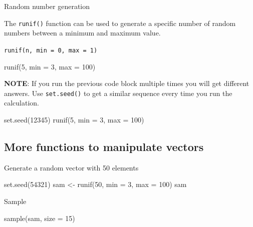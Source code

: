 \documentclass[
  letterpaper,
  DIV=11,
  numbers=noendperiod]{scrreprt}
\newenvironment{Shaded}{}{}
\newcommand{\AttributeTok}[1]{\textcolor[rgb]{0.84,0.23,0.29}{#1}}
\newcommand{\DecValTok}[1]{\textcolor[rgb]{0.00,0.36,0.77}{#1}}
\newcommand{\FunctionTok}[1]{\textcolor[rgb]{0.44,0.26,0.76}{#1}}
\newcommand{\NormalTok}[1]{\textcolor[rgb]{0.14,0.16,0.18}{#1}}
\newcommand{\OtherTok}[1]{\textcolor[rgb]{0.44,0.26,0.76}{#1}}
\begin{document}
Random number generation

The \texttt{runif()} function can be used to generate a specific number
of random numbers between a minimum and maximum value.

\texttt{runif(n,\ min\ =\ 0,\ max\ =\ 1)}

\begin{Shaded}
\begin{Highlighting}[]
\FunctionTok{runif}\NormalTok{(}\DecValTok{5}\NormalTok{, }\AttributeTok{min =} \DecValTok{3}\NormalTok{, }\AttributeTok{max =} \DecValTok{100}\NormalTok{)}
\end{Highlighting}
\end{Shaded}

\textbf{NOTE}: If you run the previous code block multiple times you
will get different answers. Use \texttt{set.seed()} to get a similar
sequence every time you run the calculation.

\begin{Shaded}
\begin{Highlighting}[]
\FunctionTok{set.seed}\NormalTok{(}\DecValTok{12345}\NormalTok{)}
\FunctionTok{runif}\NormalTok{(}\DecValTok{5}\NormalTok{, }\AttributeTok{min =} \DecValTok{3}\NormalTok{, }\AttributeTok{max =} \DecValTok{100}\NormalTok{)}
\end{Highlighting}
\end{Shaded}

\subsection{More functions to manipulate
vectors}\label{more-functions-to-manipulate-vectors}

Generate a random vector with 50 elements

\begin{Shaded}
\begin{Highlighting}[]
\FunctionTok{set.seed}\NormalTok{(}\DecValTok{54321}\NormalTok{)}
\NormalTok{sam }\OtherTok{\textless{}{-}} \FunctionTok{runif}\NormalTok{(}\DecValTok{50}\NormalTok{, }\AttributeTok{min =} \DecValTok{3}\NormalTok{, }\AttributeTok{max =} \DecValTok{100}\NormalTok{)}
\NormalTok{sam}
\end{Highlighting}
\end{Shaded}

Sample

\begin{Shaded}
\begin{Highlighting}[]
\FunctionTok{sample}\NormalTok{(sam, }\AttributeTok{size =} \DecValTok{15}\NormalTok{)}
\end{Highlighting}
\end{Shaded}
\end{document}
